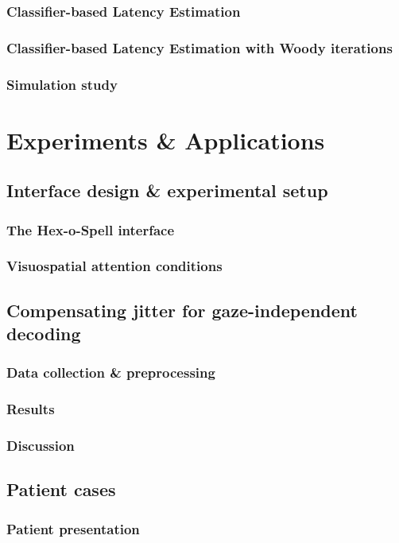 \documentclass[draft]{book}
\begin{document}
\section{Classifier-based Latency Estimation}
\section{Classifier-based Latency Estimation with Woody iterations}
\section{Simulation study}

\part{Experiments \& Applications}

\chapter{Interface design \& experimental setup}
\section{The Hex-o-Spell interface}
\section{Visuospatial attention conditions}

\chapter{Compensating jitter for gaze-independent decoding}
\section{Data collection \& preprocessing}
\section{Results}
\section{Discussion}

\chapter{Patient cases}
\section{Patient presentation}
\end{document}
